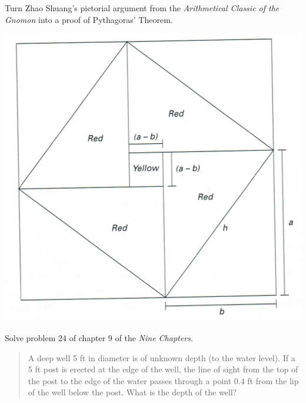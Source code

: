 \begin{exercisessec}{}{}
\begin{enumerate}
	  \begin{minipage}[t]{0.53\linewidth}\vspace{0pt}
		  \item\label{exs:gaoguproof}%
		  Turn Zhao Shuang's pictorial argument from the \emph{Arithmetical Classic of the Gnomon} into a proof of Pythagoras' Theorem.
	 	\end{minipage}
	 	\hfill
	 	\begin{minipage}[t]{0.46\linewidth}\vspace{0pt}
	 		\flushright\includegraphics[scale=0.25,angle=-1]{ZhaoPythag}
	  \end{minipage}
	
	
		
		\item Solve problem 24 of chapter 9 of  the \emph{Nine Chapters.}
		\begin{quote}
			A deep well 5 ft in diameter is of unknown depth (to the water level). If a 5 ft post is erected at the edge of the well, the line of sight from the top of the post to the edge of the water passes through a point 0.4 ft from the lip of the well below the post. What is the depth of the well?
		\end{quote}
	  

\end{enumerate}
\end{exercisessec}
